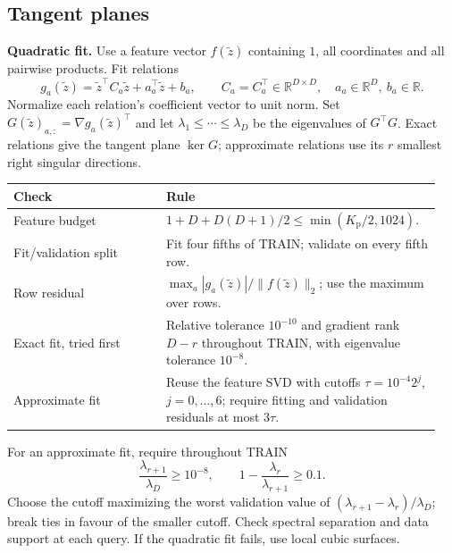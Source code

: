 \documentclass[11pt,a4paper]{article}
\newcommand{\R}{\mathbb R}
\begin{document}
\subsection*{Tangent planes}
\textbf{Quadratic fit.}
Use a feature vector $f(\widetilde z)$ containing $1$, all coordinates and
all pairwise products. Fit relations
\[
g_a(\widetilde z)=\widetilde z^\top C_a\widetilde z+
 a_a^\top\widetilde z+b_a,\qquad
C_a=C_a^\top\in\R^{D\times D},\quad a_a\in\R^D,\ b_a\in\R.
\]
Normalize each relation's coefficient vector to unit norm.
Set $G(\widetilde z)_{a,:}=\nabla g_a(\widetilde z)^\top$ and let
$\lambda_1\le\cdots\le\lambda_D$ be the eigenvalues of $G^\top G$.
Exact relations give the tangent plane $\ker G$; approximate relations
use its $r$ smallest right singular directions.
\begin{center}
\begin{tabular}{@{}p{0.34\linewidth}p{0.61\linewidth}@{}}
\toprule
Check & Rule\\
\midrule
Feature budget & $1+D+D(D+1)/2\le\min(K_{\mathrm p}/2,1024)$.\\
Fit/validation split & Fit four fifths of TRAIN; validate on every fifth row.\\
Row residual & $\max_a|g_a(\widetilde z)|/\|f(\widetilde z)\|_2$;
use the maximum over rows.\\
Exact fit, tried first & Relative tolerance $10^{-10}$ and gradient rank
$D-r$ throughout TRAIN, with eigenvalue tolerance $10^{-8}$.\\
Approximate fit & Reuse the feature SVD with cutoffs
$\tau=10^{-4}2^j$, $j=0,\ldots,6$; require fitting and validation
residuals at most $3\tau$.\\
\bottomrule
\end{tabular}
\end{center}
For an approximate fit, require throughout TRAIN
\[
\frac{\lambda_{r+1}}{\lambda_D}\ge10^{-8},\qquad
1-\frac{\lambda_r}{\lambda_{r+1}}\ge0.1.
\]
Choose the cutoff maximizing the worst validation value of
$(\lambda_{r+1}-\lambda_r)/\lambda_D$; break ties in favour of the smaller
cutoff. Check spectral separation and data support at each query.
If the quadratic fit fails, use local cubic surfaces.
\end{document}
